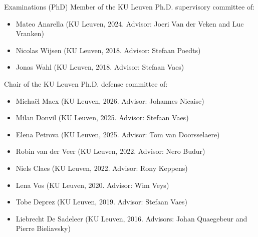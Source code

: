 \documentclass[12p]{resume}
\begin{document}
\begin{category}{Examinations (PhD)}
\citemnobullet 
 Member of the KU Leuven Ph.D. supervisory committee of:
\begin{itemize}
\item Mateo Anarella (KU Leuven, 2024. Advisor:  Joeri Van der Veken and Luc Vranken) 
\item Nicolas Wijsen (KU Leuven, 2018. Advisor:  Stefaan Poedts)
\item Jonas Wahl (KU Leuven, 2018. Advisor:  Stefaan Vaes)
\end{itemize}

\citemnobullet 
Chair of the KU Leuven Ph.D. defense committee of:
\begin{itemize}
\item Micha\"el Maex (KU Leuven, 2026. Advisor: Johannes Nicaise)
\item Milan Donvil (KU Leuven, 2025. Advisor: Stefaan Vaes)
\item Elena Petrova (KU Leuven, 2025. Advisor: Tom van Doorsselaere)
\item Robin van der Veer (KU Leuven, 2022. Advisor: Nero Budur)
\item Niels Claes  (KU Leuven, 2022. Advisor: Rony Keppens)
\item Lena Vos  (KU Leuven, 2020. Advisor: Wim Veys)
\item Tobe Deprez  (KU Leuven, 2019. Advisor: Stefaan Vaes)
\item Liebrecht De Sadeleer  (KU Leuven, 2016. Advisors: Johan Quaegebeur and Pierre Bieliavsky)
\end{itemize}
\end{category}
\end{document}
